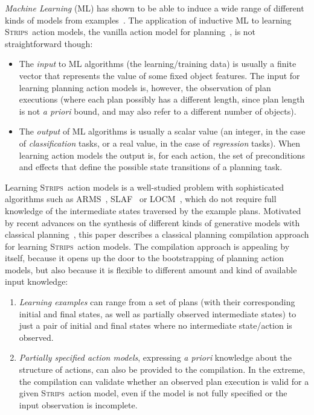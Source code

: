 \documentclass[runningheads]{llncs}
\newcommand{\strips}{\textsc{Strips}}     %
\begin{document}
{\em Machine Learning} (ML) has shown to be able to induce a wide range of different kinds of models from examples~\cite{michalski2013machine}. The application of inductive ML to learning \strips\ action models, the vanilla action model for planning~\cite{fikes1971strips}, is not straightforward though:
\begin{itemize}
\item The {\em input} to ML algorithms (the learning/training data) is usually a finite vector that represents the value of some fixed object features. The input for learning planning action models is, however, the observation of plan executions (where each plan possibly has a different length, since plan length is not {\em a priori} bound, and may also refer to a different number of objects).
\item The {\em output} of ML algorithms is usually a scalar value (an integer, in the case of {\em classification} tasks, or a real value, in the case of {\em regression} tasks). When learning action models the output is, for each action, the set of preconditions and effects that define the possible state transitions of a planning task.
\end{itemize}

Learning \strips\ action models is a well-studied problem with sophisticated algorithms such as {\sc ARMS}~\cite{yang2007learning}, {\sc SLAF}~\cite{amir:alearning:JAIR08} or {\sc LOCM}~\cite{cresswell2013acquiring}, which do not require full knowledge of the intermediate states traversed by the example plans. Motivated by recent advances on the synthesis of different kinds of generative models with classical planning~\cite{bonet2009automatic,segovia2017generating,segovia2018computing,segovia2019computing}, this paper describes a classical planning compilation approach for learning \strips\ action models. The compilation approach is appealing by itself, because it opens up the door to the bootstrapping of planning action models, but also because it is flexible to different amount and kind of available input knowledge:
\begin{enumerate}
\item {\em Learning examples} can range from a set of plans (with their corresponding initial and final states, as well as partially observed intermediate states) to just a pair of initial and final states where no intermediate state/action is observed.
\item {\em Partially specified action models}, expressing {\em a priori} knowledge about the structure of actions, can also be provided to the compilation. In the extreme, the compilation can validate whether an observed plan execution is valid for a given \strips\ action model, even if the model is not fully specified or the input observation is incomplete.
\end{enumerate}
\end{document}
